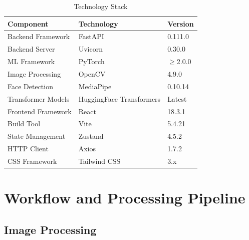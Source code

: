 \renewcommand{\arraystretch}{1.3}
\begin{table}[htbp]
  \centering
  \begin{tabular}{|l|l|l|}
  \hline
  \textbf{Component}        & \textbf{Technology}            & \textbf{Version} \\
  \hline
  Backend Framework         & FastAPI                        & 0.111.0 \\
  Backend Server            & Uvicorn                        & 0.30.0  \\
  ML Framework              & PyTorch                        & $\geq$2.0.0 \\
  Image Processing          & OpenCV                         & 4.9.0   \\
  Face Detection            & MediaPipe                      & 0.10.14 \\
  Transformer Models        & HuggingFace Transformers       & Latest  \\
  \hline
  Frontend Framework        & React                          & 18.3.1  \\
  Build Tool                & Vite                           & 5.4.21  \\
  State Management          & Zustand                        & 4.5.2   \\
  HTTP Client               & Axios                          & 1.7.2   \\
  CSS Framework             & Tailwind CSS                   & 3.x     \\
  \hline
  \end{tabular}
  \caption{Technology Stack}
  \label{c3:tab3}
\end{table}

\section{Workflow and Processing Pipeline}

\subsection{Image Processing}

